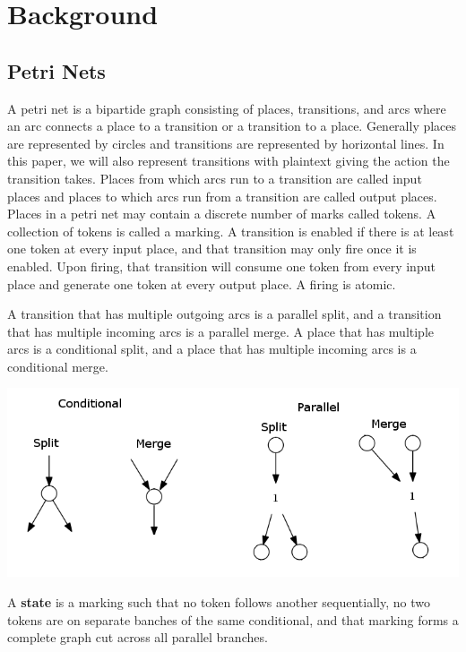 \section{Background}

\subsection{Petri Nets}

A petri net is a bipartide graph consisting of places, transitions, and arcs where an arc connects a place to a transition or a transition to a place. Generally places are represented by circles and transitions are represented by horizontal lines. In this paper, we will also represent transitions with plaintext giving the action the transition takes. Places from which arcs run to a transition are called input places and places to which arcs run from a transition are called output places. Places in a petri net may contain a discrete number of marks called tokens. A collection of tokens is called a marking. A transition is enabled if there is at least one token at every input place, and that transition may only fire once it is enabled. Upon firing, that transition will consume one token from every input place and generate one token at every output place. A firing is atomic.

A transition that has multiple outgoing arcs is a parallel split, and a transition that has multiple incoming arcs is a parallel merge. A place that has multiple arcs is a conditional split, and a place that has multiple incoming arcs is a conditional merge.

\begin{center}
\includegraphics[scale=0.475]{figures/structure.png}
\end{center}

\begin{definition}
A \textbf{state} is a marking such that no token follows another sequentially, no two tokens are on separate banches of the same conditional, and that marking forms a complete graph cut across all parallel branches.
\end{definition}

